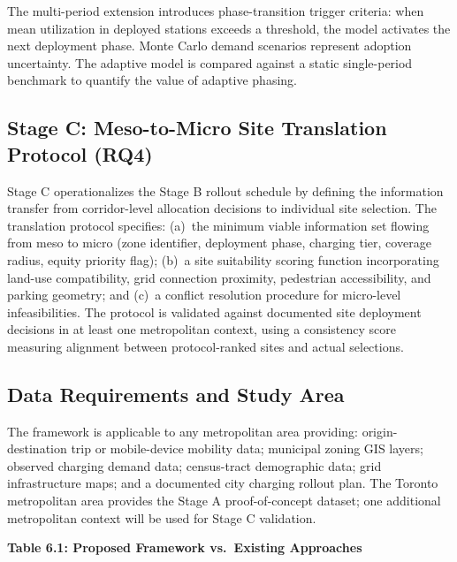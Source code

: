 \documentclass[12pt,letterpaper]{article}
\begin{document}
The multi-period extension introduces phase-transition trigger criteria:
when mean utilization in deployed stations exceeds a threshold, the model
activates the next deployment phase.  Monte Carlo demand scenarios
represent adoption uncertainty.  The adaptive model is compared against a
static single-period benchmark to quantify the value of adaptive phasing.

\subsection{Stage C: Meso-to-Micro Site Translation Protocol (RQ4)}

Stage C operationalizes the Stage B rollout schedule by defining the
information transfer from corridor-level allocation decisions to
individual site selection.  The translation protocol specifies: (a)~the
minimum viable information set flowing from meso to micro (zone
identifier, deployment phase, charging tier, coverage radius, equity
priority flag); (b)~a site suitability scoring function incorporating
land-use compatibility, grid connection proximity, pedestrian
accessibility, and parking geometry; and (c)~a conflict resolution
procedure for micro-level infeasibilities.  The protocol is validated
against documented site deployment decisions in at least one metropolitan
context, using a consistency score measuring alignment between
protocol-ranked sites and actual selections.

\subsection{Data Requirements and Study Area}

The framework is applicable to any metropolitan area providing:
origin-destination trip or mobile-device mobility data; municipal zoning
GIS layers; observed charging demand data; census-tract demographic data;
grid infrastructure maps; and a documented city charging rollout plan.
The Toronto metropolitan area provides the Stage A proof-of-concept
dataset; one additional metropolitan context will be used for Stage C
validation.

\noindent\textbf{Table 6.1: Proposed Framework vs.\ Existing Approaches}
\end{document}
